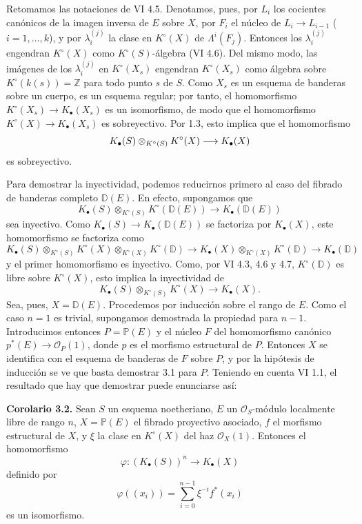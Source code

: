 Retomamos las notaciones de VI 4.5. Denotamos, pues, por $L_i$ los cocientes canónicos de la imagen inversa de $E$ sobre $X$, por $F_i$ el núcleo de $L_i\to L_{i-1}$ ($i=1,\ldots,k$), y por $\lambda_i^{(j)}$ la clase en $K^\circ(X)$ de $\Lambda^i(F_j)$. Entonces los $\lambda_i^{(j)}$ engendran $K^\circ(X)$ como $K^\circ(S)$-álgebra (VI 4.6). Del mismo modo, las imágenes de los $\lambda_i^{(j)}$ en $K^\circ(X_s)$ engendran $K^\circ(X_s)$ como álgebra sobre $K^\circ(k(s))=\mathbb Z$ para todo punto $s$ de $S$. Como $X_s$ es un esquema de banderas sobre un cuerpo, es un esquema regular; por tanto, el homomorfismo $K^\circ(X_s)\to K_\bullet(X_s)$ es un isomorfismo, de modo que el homomorfismo $K^\circ(X)\to K_\bullet(X_s)$ es sobreyectivo. Por 1.3, esto implica que el homomorfismo
\[
K_\bullet(S)\otimes_{K^\circ(S)}K^\circ(\sisi{S}{X})\longrightarrow K_\bullet(X)
\]
es sobreyectivo.

Para demostrar la inyectividad, podemos reducirnos primero al caso del fibrado de banderas completo $\mathbb D(E)$. En efecto, supongamos que
\[
K_\bullet(S)\otimes_{K^\circ(S)}K^\circ(\mathbb D(E))\longrightarrow K_\bullet(\mathbb D(E))
\]
sea inyectivo. Como $K_\bullet(S)\to K_\bullet(\mathbb D(E))$ se factoriza por $K_\bullet(X)$, este homomorfismo se factoriza como
\[
K_\bullet(S)\otimes_{K^\circ(S)}K^\circ(X)\otimes_{K^\circ(X)}K^\circ(\mathbb D)
\longrightarrow K_\bullet(X)\otimes_{K^\circ(X)}K^\circ(\mathbb D)
\longrightarrow K_\bullet(\mathbb D)
\]
y el primer homomorfismo es inyectivo. Como, por VI 4.3, 4.6 y 4.7, $K^\circ(\mathbb D)$ es libre sobre $K^\circ(X)$, esto implica la inyectividad de
\[
K_\bullet(S)\otimes_{K^\circ(S)}K^\circ(X)\to K_\bullet(X).
\]
Sea, pues, $X=\mathbb D(E)$. Procedemos por inducción sobre el rango de $E$. Como el caso $n=1$ es trivial, supongamos demostrada la propiedad para $n-1$. Introducimos entonces $P=\mathbb P(E)$ y el núcleo $F$ del homomorfismo canónico $p^*(E)\to \mathcal O_P(1)$, donde $p$ es el morfismo estructural de $P$. Entonces $X$ se identifica con el esquema de banderas de $F$ sobre $P$, y por la hipótesis de inducción se ve que basta demostrar 3.1 para $P$. Teniendo en cuenta VI 1.1, el resultado que hay que demostrar puede enunciarse así:

\textbf{Corolario 3.2.} Sean $S$ un esquema noetheriano, $E$ un $\mathcal O_S$-módulo localmente libre de rango $n$, $X=\mathbb P(E)$ el fibrado proyectivo asociado, $f$ el morfismo estructural de $X$, y $\xi$ la clase en $K^\circ(X)$ del haz $\mathcal O_X(1)$. Entonces el homomorfismo
\[
\varphi:(K_\bullet(S))^n\longrightarrow K_\bullet(X)
\]
definido por
\[
\varphi((x_i))=\sum_{i=0}^{n-1}\xi^{-i}f^*(x_i)
\]
es un isomorfismo.

